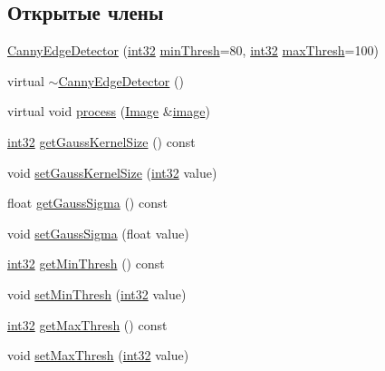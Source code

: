 \subsection*{Открытые члены}
\begin{DoxyCompactItemize}
\item 
\hyperlink{class_canny_edge_detector_a6f7de6f12f8b52563d28e612a46f7a0d}{Canny\+Edge\+Detector} (\hyperlink{number_8h_a43d43196463bde49cb067f5c20ab8481}{int32} \hyperlink{class_canny_edge_detector_ae88472e936f883044b00e8cd50f662c6}{min\+Thresh}=80, \hyperlink{number_8h_a43d43196463bde49cb067f5c20ab8481}{int32} \hyperlink{class_canny_edge_detector_ab551b06077d0221f1caa6e5e4cce48d9}{max\+Thresh}=100)
\item 
virtual \hyperlink{class_canny_edge_detector_ad6f031b85ac2fc2f916ecaa04c536c01}{$\sim$\+Canny\+Edge\+Detector} ()
\item 
virtual void \hyperlink{class_canny_edge_detector_ae97e095e14e43d763a8fc2563f6e9a87}{process} (\hyperlink{class_image}{Image} \&\hyperlink{class_canny_edge_detector_a271e3c9036a5cb2611bb1b7da4d7d146}{image})
\item 
\hyperlink{number_8h_a43d43196463bde49cb067f5c20ab8481}{int32} \hyperlink{class_canny_edge_detector_a38218d65e7d450dc226e3bbb0c7043e9}{get\+Gauss\+Kernel\+Size} () const 
\item 
void \hyperlink{class_canny_edge_detector_adb6b71e26f03edea19d3fef041fd6cbd}{set\+Gauss\+Kernel\+Size} (\hyperlink{number_8h_a43d43196463bde49cb067f5c20ab8481}{int32} value)
\item 
float \hyperlink{class_canny_edge_detector_ac3e362832dcd3e18801bed15856e79b4}{get\+Gauss\+Sigma} () const 
\item 
void \hyperlink{class_canny_edge_detector_afc77ac77d033264009ea66670eeec9d0}{set\+Gauss\+Sigma} (float value)
\item 
\hyperlink{number_8h_a43d43196463bde49cb067f5c20ab8481}{int32} \hyperlink{class_canny_edge_detector_aa0ae63194968f376d4ea6e6d7e13f285}{get\+Min\+Thresh} () const 
\item 
void \hyperlink{class_canny_edge_detector_a825df00f677a9a949d0dcb87939a99b5}{set\+Min\+Thresh} (\hyperlink{number_8h_a43d43196463bde49cb067f5c20ab8481}{int32} value)
\item 
\hyperlink{number_8h_a43d43196463bde49cb067f5c20ab8481}{int32} \hyperlink{class_canny_edge_detector_aa3cb693f65b9a07e5f245d7ecadf9c5c}{get\+Max\+Thresh} () const 
\item 
void \hyperlink{class_canny_edge_detector_ae48e5be375a3a3d23c4dc81a158149c7}{set\+Max\+Thresh} (\hyperlink{number_8h_a43d43196463bde49cb067f5c20ab8481}{int32} value)
\end{DoxyCompactItemize}
